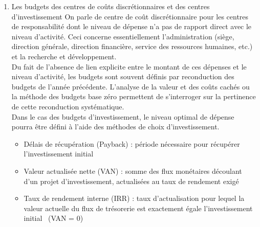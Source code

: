 \documentclass{tufte-handout}
\begin{document}
\begin{enumerate}
\begin{itemize}
\end{itemize}
Diverses méthodes permettent alors d'optimiser ce coût d'approvisionnement\footnote{Par exemple, \href{https://fr.wikipedia.org/wiki/Formule\_de\_Wilson}{la formule de Wilson}\\}.\\
Le programme d'approvisionnement comprend évidence 4 éléments : les commandes, les livraisons, les consommations et le stock (fin de mois).\\
Le budget des coûts d'approvisionnement comprend :\\
\begin{itemize}
\item les coûts d'achat, qui dépendent souvent des quantités achetées et doivent inclure les frais liés aux achats (notamment le transport) ;\\
\item les coûts d'approvisionnement (de passation de commande) et de stockage.\\
\end{itemize}
\item Les budgets des centres de coûts discrétionnaires et des centres d'investissement
\label{sec:org00c8ff1}
On parle de centre de coût discrétionnaire pour les centres de responsabilité dont le niveau de dépense n'a pas de rapport direct avec le niveau d'activité. Ceci concerne essentiellement l'administration (siège, direction générale, direction financière, service des ressources humaines, etc.) et la recherche et développement.\\
Du fait de l'absence de lien explicite entre le montant de ces dépenses et le niveau d'activité, les budgets sont souvent définis par reconduction des budgets de l'année précédente. L'analyse de la valeur et des coûts cachés ou la méthode des budgets base zéro permettent de s'interroger sur la pertinence de cette reconduction systématique.\\
Dans le cas des budgets d'investissement, le niveau optimal de dépense pourra être défini à l'aide des méthodes de choix d'investissement.\\
\begin{itemize}
\item Délais de récupération (Payback) : période nécessaire pour récupérer l'investissement initial\\
\item Valeur actualisée nette (VAN) : somme des flux monétaires découlant d’un projet d’investissement, actualisées au taux de rendement exigé\\
\item Taux de rendement interne (IRR) : taux d’actualisation  pour lequel la valeur actuelle du flux de trésorerie est exactement égale l'investissement initial  (VAN  = 0)\\
\end{itemize}


\end{enumerate}
\end{document}
